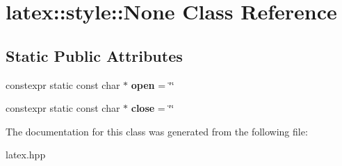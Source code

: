 \hypertarget{classlatex_1_1style_1_1None}{\section{latex\-:\-:style\-:\-:None Class Reference}
\label{classlatex_1_1style_1_1None}
}
\subsection*{Static Public Attributes}
\begin{DoxyCompactItemize}
\item 
\hypertarget{classlatex_1_1style_1_1None_a742bf0986955725b3cbe15bbb889cec9}{constexpr static const char $\ast$ {\bfseries open} = \char`\"{}\char`\"{}}\label{classlatex_1_1style_1_1None_a742bf0986955725b3cbe15bbb889cec9}

\item 
\hypertarget{classlatex_1_1style_1_1None_aafb4d115dc87e0ae25cc5a38a49e9f38}{constexpr static const char $\ast$ {\bfseries close} = \char`\"{}\char`\"{}}\label{classlatex_1_1style_1_1None_aafb4d115dc87e0ae25cc5a38a49e9f38}

\end{DoxyCompactItemize}


The documentation for this class was generated from the following file\-:\begin{DoxyCompactItemize}
\item 
latex.\-hpp\end{DoxyCompactItemize}
